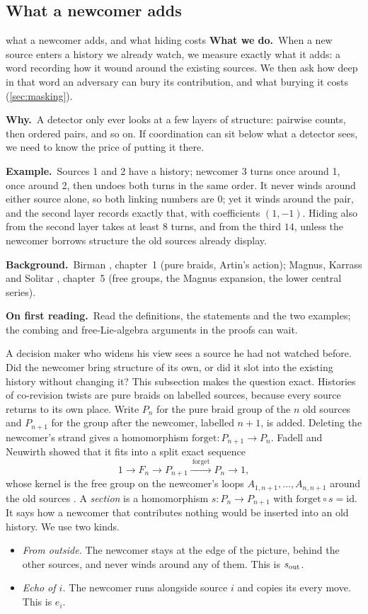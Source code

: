 \documentclass[11pt]{article}
\theoremstyle{definition}\newtheorem{definition}[theorem]{Definition}\newtheorem{remark}[theorem]{Remark}\newtheorem{example}[theorem]{Example}\newtheorem{problem}[theorem]{Open problem}\crefname{problem}{Problem}{Problems}
\newcommand{\rbwhat}{\textcolor{rbWhat}{\textbf{What we do.}}~}\newcommand{\rbwhy}{\par\smallskip\textcolor{rbWhy}{\textbf{Why.}}~}
\newcommand{\rbex}{\par\smallskip\textcolor{rbEx}{\textbf{Example.}}~}\newcommand{\rbbg}{\par\smallskip\textcolor{rbBg}{\textbf{Background.}}~}
\newcommand{\rbfirst}{\par\smallskip\textcolor{rbFirst}{\textbf{On first reading.}}~}
\begin{document}
\subsection{What a newcomer adds}\label{sec:newcomer}
\begin{readerbox}{what a newcomer adds, and what hiding costs}
\rbwhat When a new source enters a history we already watch, we measure exactly what it adds: a word recording how it wound around the existing sources. We then ask how deep in that word an adversary can bury its contribution, and what burying it costs (\cref{sec:masking}).
\rbwhy A detector only ever looks at a few layers of structure: pairwise counts, then ordered pairs, and so on. If coordination can sit below what a detector sees, we need to know the price of putting it there.
\rbex Sources 1 and 2 have a history; newcomer 3 turns once around 1, once around 2, then undoes both turns in the same order. It never winds around either source alone, so both linking numbers are $0$; yet it winds around the pair, and the second layer records exactly that, with coefficients $(1,-1)$. Hiding also from the second layer takes at least $8$ turns, and from the third $14$, unless the newcomer borrows structure the old sources already display.
\rbbg Birman \cite{Birman1974}, chapter~1 (pure braids, Artin's action); Magnus, Karrass and Solitar \cite{MagnusKarrassSolitar1966}, chapter~5 (free groups, the Magnus expansion, the lower central series).
\rbfirst Read the definitions, the statements and the two examples; the combing and free-Lie-algebra arguments in the proofs can wait.
\end{readerbox}
A decision maker who widens his view sees a source he had not watched before. Did the newcomer bring structure of its own, or did it slot into the existing history without changing it? This subsection makes the question exact. Histories of co-revision twists are pure braids on labelled sources, because every source returns to its own place. Write $P_n$ for the pure braid group of the $n$ old sources and $P_{n+1}$ for the group after the newcomer, labelled $n+1$, is added. Deleting the newcomer's strand gives a homomorphism $\mathrm{forget}:P_{n+1}\to P_n$. Fadell and Neuwirth showed that it fits into a split exact sequence
\[
1\longrightarrow F_n\longrightarrow P_{n+1}\xrightarrow{\ \mathrm{forget}\ }P_n\longrightarrow 1 ,
\]
whose kernel is the free group on the newcomer's loops $A_{1,n+1},\dots,A_{n,n+1}$ around the old sources \cite{FadellNeuwirth1962,Artin1947,Birman1974}. A \emph{section} is a homomorphism $s:P_n\to P_{n+1}$ with $\mathrm{forget}\circ s=\mathrm{id}$. It says how a newcomer that contributes nothing would be inserted into an old history. We use two kinds.
\begin{itemize}
\item \emph{From outside.} The newcomer stays at the edge of the picture, behind the other sources, and never winds around any of them. This is $s_{\rm out}$.
\item \emph{Echo of $i$.} The newcomer runs alongside source $i$ and copies its every move. This is $e_i$.
\end{itemize}
\end{document}
